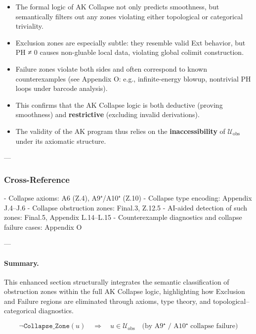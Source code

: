 \documentclass[11pt]{article}
\begin{document}
\begin{axiom}
\begin{axiom}
{{\begin{itemize}
  \item The formal logic of AK Collapse not only predicts smoothness,  
  but semantically filters out any zones violating either topological or categorical triviality.

  \item Exclusion zones are especially subtle: they resemble valid Ext behavior,  
  but PH ≠ 0 causes non-gluable local data, violating global colimit construction.

  \item Failure zones violate both sides and often correspond to known counterexamples  
  (see Appendix O: e.g., infinite-energy blowup, nontrivial PH loops under barcode analysis).

  \item This confirms that the AK Collapse logic is both deductive (proving smoothness)  
  and \textbf{restrictive} (excluding invalid derivations).

  \item The validity of the AK program thus relies on the \textbf{inaccessibility}  
  of \( \mathcal{U}_{\mathrm{obs}} \) under its axiomatic structure.
\end{itemize}

---

\subsubsection*{Cross-Reference}

- Collapse axioms: A6 (Z.4), A9⁺/A10⁺ (Z.10)
- Collapse type encoding: Appendix J.4–J.6
- Collapse obstruction zones: Final.3, Z.12.5
- AI-aided detection of such zones: Final.5, Appendix L.14–L.15  
- Counterexample diagnostics and collapse failure cases: Appendix O

---

\paragraph{Summary.}
This enhanced section structurally integrates the semantic classification of obstruction zones  
within the full AK Collapse logic, highlighting how Exclusion and Failure regions  
are eliminated through axioms, type theory, and topological–categorical diagnostics.

\[
\boxed{
\neg \texttt{Collapse\_Zone}(u) \quad \Rightarrow \quad u \in \mathcal{U}_{\mathrm{obs}} \quad \text{(by A9⁺ / A10⁺ collapse failure)}
}
\]




}}
\end{axiom}
\end{axiom}
\end{document}
